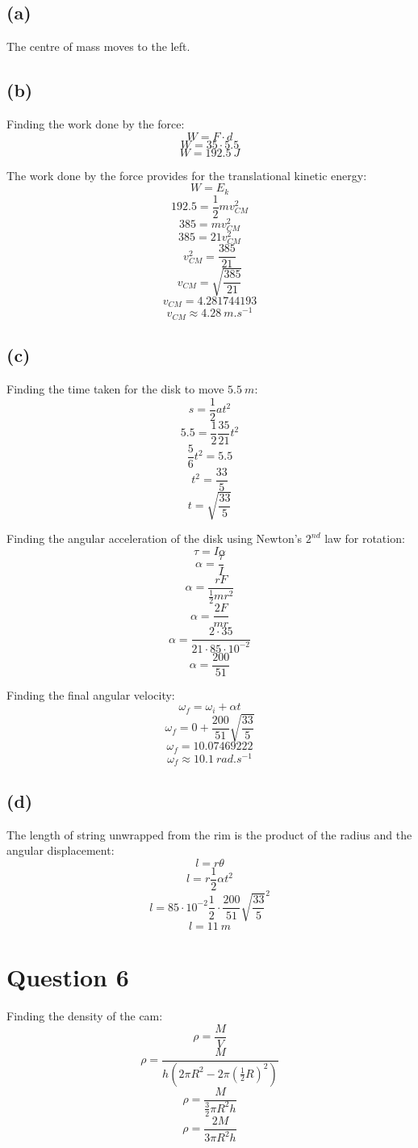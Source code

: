 \documentclass[11pt]{article}
\begin{document}
\subsection{(a)}
\label{sec:org7f7951c}
The centre of mass moves to the left.

\subsection{(b)}
\label{sec:org8abbb7b}
Finding the work done by the force:
\[W = F \cdot d\]
\[W = 35 \cdot 5.5\]
\[W = \qty{192.5}{\unit{J}} \]

The work done by the force provides for the translational kinetic energy:
\[W = E_k\]
\[192.5 = \frac{1}{2}mv_{CM}^2\]
\[385 = mv_{CM}^2\]
\[385 = 21v_{CM}^2\]
\[v_{CM}^2 = \frac{385}{21}\]
\[v_{CM} = \sqrt{\frac{385}{21}}\]
\[v_{CM} = 4.281744193\]
\[v_{CM} \approx \qty{4.28}{\unit{m.s^{-1}}}\]

\subsection{(c)}
\label{sec:orgc13bf18}
Finding the time taken for the disk to move \(\qty{5.5}{\unit{m}}\):
\[s = \frac{1}{2} at^2\]
\[5.5 = \frac{1}{2} \frac{35}{21} t^2\]
\[\frac{5}{6} t^2 = 5.5\]
\[t^2 = \frac{33}{5}\]
\[t = \sqrt{\frac{33}{5}}\]

Finding the angular acceleration of the disk using Newton's \(2^{nd}\) law for rotation:
\[\tau = I \alpha\]
\[\alpha = \frac{\tau}{I}\]
\[\alpha = \frac{rF}{\frac{1}{2}mr^2}\]
\[\alpha = \frac{2F}{mr}\]
\[\alpha = \frac{2 \cdot 35}{21 \cdot 85 \cdot 10^{-2}}\]
\[\alpha = \frac{200}{51}\]

Finding the final angular velocity:
\[\omega_f = \omega_i + \alpha t\]
\[\omega_f = 0 + \frac{200}{51} \sqrt{\frac{33}{5}}\]
\[\omega_f = 10.07469222\]
\[\omega_f \approx \qty{10.1}{\unit{rad.s^{-1}}}\]

\subsection{(d)}
\label{sec:org38b043a}
The length of string unwrapped from the rim is the product of the radius and the angular displacement:
\[l = r \theta\]
\[l = r \frac{1}{2} \alpha t^2\]
\[l = 85 \cdot 10^{-2} \frac{1}{2} \cdot \frac{200}{51} \sqrt{\frac{33}{5}}^2\]
\[l = \qty{11}{\unit{m}}\]


\section{Question 6}
\label{sec:orgc19013c}
Finding the density of the cam:
\[\rho = \frac{M}{V}\]
\[\rho = \frac{M}{h \left(2 \pi R^2 - 2 \pi \left(\frac{1}{2} R \right)^2 \right)}\]
\[\rho = \frac{M}{\frac{3}{2} \pi R^2h}\]
\[\rho = \frac{2M}{3 \pi R^2h}\]
\end{document}
